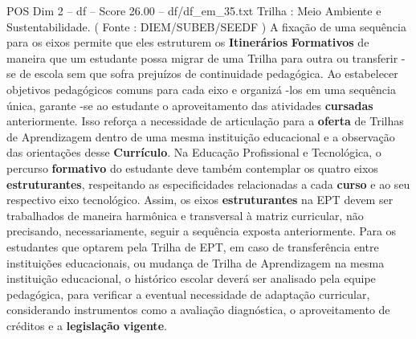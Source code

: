 \begin{textsample}{POS Dim 2 – df – Score 26.00 – df/df\_em\_35.txt}
Trilha : Meio Ambiente e Sustentabilidade. ( Fonte : DIEM/SUBEB/SEEDF ) A fixação de uma sequência para os eixos permite que eles estruturem os \textbf{Itinerários} \textbf{Formativos} de maneira que um estudante possa migrar de uma Trilha para outra ou transferir -se de escola sem que sofra prejuízos de continuidade pedagógica.
Ao estabelecer objetivos pedagógicos comuns para cada eixo e organizá -los em uma sequência única, garante -se ao estudante o aproveitamento das atividades \textbf{cursadas} anteriormente.
Isso reforça a necessidade de articulação para a \textbf{oferta} de Trilhas de Aprendizagem dentro de uma mesma instituição educacional e a observação das orientações desse \textbf{Currículo}.
Na Educação Profissional e Tecnológica, o percurso \textbf{formativo} do estudante deve também contemplar os quatro eixos \textbf{estruturantes}, respeitando as especificidades relacionadas a cada \textbf{curso} e ao seu respectivo eixo tecnológico.
Assim, os eixos \textbf{estruturantes} na EPT devem ser trabalhados de maneira harmônica e transversal à matriz curricular, não precisando, necessariamente, seguir a sequência exposta anteriormente.
Para os estudantes que optarem pela Trilha de EPT, em caso de transferência entre instituições educacionais, ou mudança de Trilha de Aprendizagem na mesma instituição educacional, o histórico escolar deverá ser analisado pela equipe pedagógica, para verificar a eventual necessidade de adaptação curricular, considerando instrumentos como a avaliação diagnóstica, o aproveitamento de créditos e a \textbf{legislação} \textbf{vigente}.

\end{textsample}
